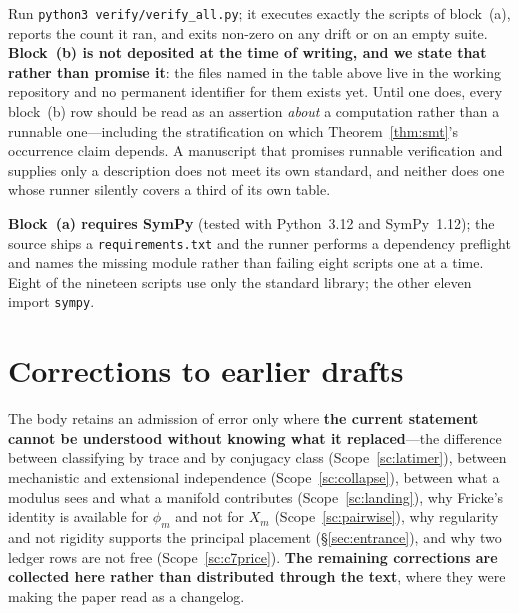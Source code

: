 \documentclass[11pt,reqno]{amsart}
\theoremstyle{plain}
\theoremstyle{definition}
\theoremstyle{remark}
\newcommand{\fn}[1]{\texttt{\small #1}}
\begin{document}
\noindent Run \fn{python3 verify/verify\_\allowbreak all.py}; it executes exactly the scripts of
block~(a), reports the count it ran, and exits non-zero on any drift or on an empty
suite. \textbf{Block~(b) is not deposited at the time of writing, and we state that rather than
promise it}: the files named in the table above live in the working repository and no
permanent identifier for them exists yet. Until one does, every block~(b) row should be
read as an assertion \emph{about} a computation rather than a runnable one---including
the stratification on which Theorem~\ref{thm:smt}'s occurrence claim depends. A
manuscript that promises runnable verification and supplies only a description does not
meet its own standard, and neither does one whose runner silently covers a third of its
own table.

\noindent\textbf{Block~(a) requires SymPy} (tested with Python~3.12 and SymPy~1.12); the
source ships a \fn{requirements.txt} and the runner performs a dependency preflight and
names the missing module rather than failing eight scripts one at a time. Eight of the nineteen scripts use only the
standard library; the other eleven import \texttt{sympy}.

\section{Corrections to earlier drafts}\label{app:corrections}

The body retains an admission of error only where \textbf{the current statement cannot be
understood without knowing what it replaced}---the difference between classifying by
trace and by conjugacy class (Scope~\ref{sc:latimer}), between mechanistic and
extensional independence (Scope~\ref{sc:collapse}), between what a modulus sees and what
a manifold contributes (Scope~\ref{sc:landing}), why Fricke's identity is available for
$\phi_m$ and not for $X_m$ (Scope~\ref{sc:pairwise}), why regularity and not rigidity
supports the principal placement (\S\ref{sec:entrance}), and why two ledger rows are not
free (Scope~\ref{sc:c7price}). \textbf{The remaining corrections are collected here
rather than distributed through the text}, where they were making the paper read as a
changelog.
\end{document}
